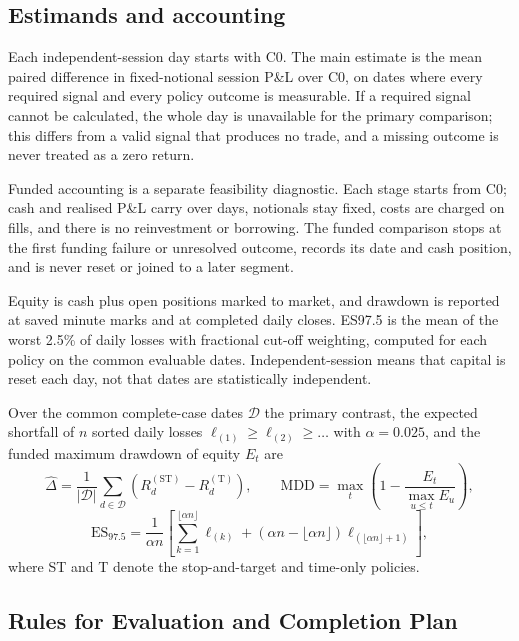 \documentclass[11pt,a4paper]{article}
\begin{document}
\subsection*{Estimands and accounting}

Each independent-session day starts with C0. The main estimate is the mean paired difference in fixed-notional session P\&L over C0, on dates where every required signal and every policy outcome is measurable. If a required signal cannot be calculated, the whole day is unavailable for the primary comparison; this differs from a valid signal that produces no trade, and a missing outcome is never treated as a zero return.

Funded accounting is a separate feasibility diagnostic. Each stage starts from C0; cash and realised P\&L carry over days, notionals stay fixed, costs are charged on fills, and there is no reinvestment or borrowing. The funded comparison stops at the first funding failure or unresolved outcome, records its date and cash position, and is never reset or joined to a later segment.

Equity is cash plus open positions marked to market, and drawdown is reported at saved minute marks and at completed daily closes. ES97.5 is the mean of the worst 2.5\% of daily losses with fractional cut-off weighting, computed for each policy on the common evaluable dates. Independent-session means that capital is reset each day, not that dates are statistically independent.

Over the common complete-case dates $\mathcal{D}$ the primary contrast, the expected shortfall of $n$ sorted daily losses $\ell_{(1)} \ge \ell_{(2)} \ge \dots$ with $\alpha = 0.025$, and the funded maximum drawdown of equity $E_t$ are
\begin{equation}
\hat{\Delta} = \frac{1}{|\mathcal{D}|}\sum_{d \in \mathcal{D}}\left(R^{(\mathrm{ST})}_d - R^{(\mathrm{T})}_d\right), \qquad
\mathrm{MDD} = \max_t\left(1 - \frac{E_t}{\max_{u \le t} E_u}\right),
\end{equation}
\begin{equation}
\mathrm{ES}_{97.5} = \frac{1}{\alpha n}\left[\sum_{k=1}^{\lfloor \alpha n \rfloor} \ell_{(k)} + \left(\alpha n - \lfloor \alpha n \rfloor\right)\ell_{(\lfloor \alpha n \rfloor + 1)}\right],
\end{equation}
where ST and T denote the stop-and-target and time-only policies.


\subsection*{Rules for Evaluation and Completion Plan}
\end{document}
